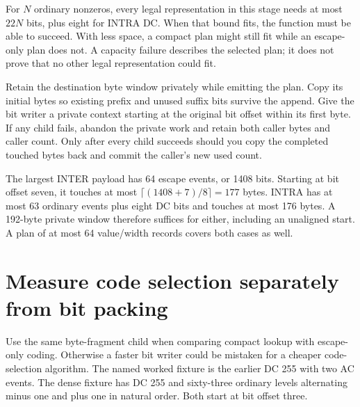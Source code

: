 For $N$ ordinary nonzeros, every legal representation in this stage needs at most
$22N$ bits, plus eight for INTRA DC. When that bound fits, the function must be
able to succeed. With less space, a compact plan might still fit while an
escape-only plan does not. A capacity failure describes the selected plan;
it does not prove that no other legal representation could fit.

Retain the destination byte window privately while emitting the plan. Copy its
initial bytes so existing prefix and unused suffix bits survive the append.
Give the bit writer a private context starting at the original bit offset within
its first byte. If any child fails, abandon the private work and retain both
caller bytes and caller count. Only after every child succeeds should you copy
the completed touched bytes back and commit the caller's new used count.

The largest INTER payload has 64 escape events, or 1408 bits. Starting at bit
offset seven, it touches at most $\lceil(1408+7)/8\rceil=177$ bytes. INTRA has at
most 63 ordinary events plus eight DC bits and touches at most 176 bytes. A
192-byte private window therefore suffices for either, including an unaligned
start. A plan of at most 64 value/width records covers both cases as well.

\section{Measure code selection separately from bit packing}
Use the same byte-fragment child when comparing compact lookup with escape-only
coding. Otherwise a faster bit writer could be mistaken for a cheaper code-selection
algorithm. The named worked fixture is the earlier DC 255 with two AC events.
The dense fixture has DC 255 and sixty-three ordinary levels alternating minus
one and plus one in natural order. Both start at bit offset three.


